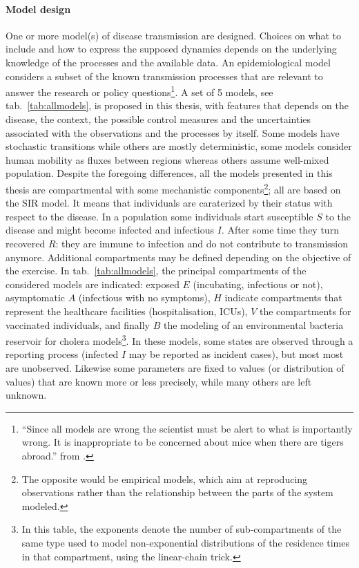 \paragraph{Model design} One or more model(s) of disease transmission are designed. Choices on what to include and how to express the supposed dynamics depends on the underlying knowledge of the processes and the available data. An epidemiological model considers a subset of the known transmission processes that are relevant to answer the research or policy questions\footnote[][]{“Since all models are wrong the scientist must be alert to what is importantly wrong. It is inappropriate to be concerned about mice when there are tigers abroad.” from .}. A set of 5 models, see tab.~\ref{tab:allmodels}, is proposed in this thesis, with features that depends on the disease, the context, the possible control measures and the uncertainties associated with the observations and the processes by itself. Some models have stochastic transitions while others are mostly deterministic, some models consider human mobility as fluxes between regions whereas others assume well-mixed population. Despite the foregoing differences, all the models presented in this thesis are compartmental with some mechanistic components\footnote{The opposite would be empirical models, which aim at reproducing observations rather than the relationship between the parts of the system modeled.}; all are based on the SIR model. It means that individuals are caraterized by their status with respect to the disease. In a population some individuals start susceptible $S$ to the disease and might become infected and infectious $I$. After some time they turn recovered $R$: they are immune to infection and do not contribute to transmission anymore. %
Additional compartments may be defined depending on the objective of the exercise. In tab.~\ref{tab:allmodels}, the principal compartments of the considered models are indicated: exposed $E$ (incubating, infectious or not), asymptomatic $A$ (infectious with no symptoms), $H$ indicate compartments that represent the healthcare facilities (hospitalisation, ICUs), $V$ the compartments for vaccinated individuals, and finally $B$ the modeling of an environmental bacteria reservoir for cholera models\footnote{In this table, the exponents denote the number of sub-compartments of the same type used to model non-exponential distributions of the residence times in that compartment, using the linear-chain trick.}.
In these models, some states are observed through a reporting process (\eg infected $I$ may be reported as incident cases), but most most are unobserved. Likewise some parameters are fixed to values (or distribution of values) that are known more or less precisely, while many others are left unknown.

